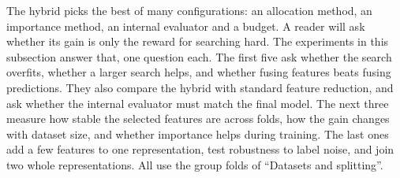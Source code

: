 
The hybrid picks the best of many configurations: an allocation method, an importance method, an internal evaluator and a budget. A reader will ask whether its gain is only the reward for searching hard. The experiments in this subsection answer that, one question each. The first five ask whether the search overfits, whether a larger search helps, and whether fusing features beats fusing predictions. They also compare the hybrid with standard feature reduction, and ask whether the internal evaluator must match the final model. The next three measure how stable the selected features are across folds, how the gain changes with dataset size, and whether importance helps during training. The last ones add a few features to one representation, test robustness to label noise, and join two whole representations. All use the group folds of ``Datasets and splitting''.

